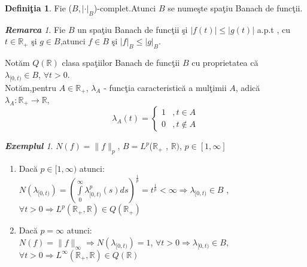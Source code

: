 \documentclass[ a4paper, 12pt]{report}
\theoremstyle{definition}
\newtheorem{definition}{\bf Defini\c tia}[section]
\theoremstyle{remark}
\newtheorem{remarc}{\bf Remarca}[section]
\newtheorem{exemple}{\bf Exemplul}[section]
\numberwithin{equation}{section}
\begin{document}
\begin{definition}
Fie ($B,\lvert \cdot \rvert_B$)-complet.Atunci $B$ se nume\c ste spa\c tiu Banach de func\c tii.
\end{definition}
\begin{remarc}
Fie $B$ un spa\c tiu Banach de func\c tii \c si $\lvert f(t)\rvert \leqslant \lvert g(t)\rvert$ a.p.t , cu $t \in \mathbb{R}_+$ \c si $g \in B$,atunci $f \in B$ \c si $\vert f \rvert_B \leqslant \lvert g \rvert_B$.
\end{remarc}
Not\u am $Q(\mathbb{R})$ clasa spa\c tiilor Banach de func\c tii $B$ cu proprietatea c\u a\\ $\lambda_{[0,t)} \in B$, $ \forall t>0$.\\
Not\u am,pentru $ A \in \mathbb{R}_+ $, $\lambda_A$ - func\c tia caracteristic\u a a mul\c timii $A$, adic\u a\\ $ \lambda_A : \mathbb{R}_+ \rightarrow \mathbb{R}$,
\begin{equation*}
\lambda_A (t)=
\begin{cases}
1 &, t \in A \\
0 &, t \notin A
\end{cases}
\end{equation*}
\begin{exemple}
$ N(f) = \lVert f \rVert_p$, $B = L^p$($\mathbb{R}_+$ , $\mathbb{R})$, $p \in [1,\infty]$ \\
\begin{enumerate}
\item Dac\u a $ p \in [1,\infty)$ atunci:\\
$N(\lambda_{[0,t)})=(\int\limits_{0}^{\infty} \lambda_{[0,t)}^p (s)  ds)^ \frac{1}{p} = t^\frac{1}{p}<\infty \Rightarrow \lambda_{[0,t)}\in B$ , $\forall t>0 \Rightarrow L^p (\mathbb{R}_+,\mathbb{R}) \in Q(\mathbb{R}_+)$\\
\item Dac\u a $p = \infty $ atunci:\\
$N(f) = \lVert f \rVert_{\infty} \Rightarrow N(\lambda_{[0,t)}) = 1$, $\forall t> 0 \Rightarrow \lambda_{[0,t)} \in B$, $\forall t>0 \Rightarrow L^{\infty}(\mathbb{R}_+ , \mathbb{R}) \in Q(\mathbb{R})$ \\
\end{enumerate}
\end{exemple}
\end{document}
